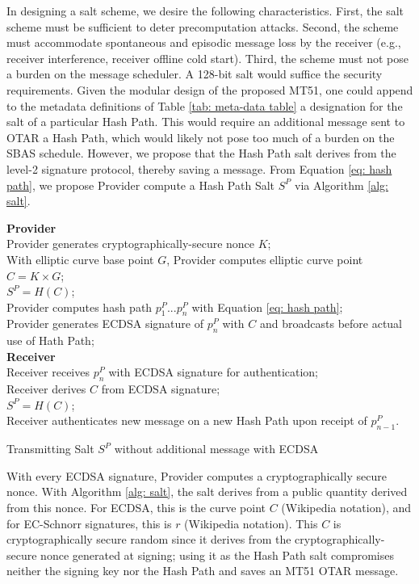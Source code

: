 \documentclass[letterpaper,times]{IONconf/IONconf}
\begin{document}
In designing a salt scheme, we desire the following characteristics.
First, the salt scheme must be sufficient to deter precomputation attacks.
Second, the scheme must accommodate spontaneous and episodic message loss by the receiver (e.g., receiver interference, receiver offline cold start).
Third, the scheme must not pose a burden on the message scheduler.
A 128-bit salt would suffice the security requirements.
Given the modular design of the proposed MT51, one could append to the metadata definitions of Table \ref{tab: meta-data table} a designation for the salt of a particular Hash Path.
This would require an additional message sent to OTAR a Hash Path, which would likely not pose too much of a burden on the SBAS schedule.
However, we propose that the Hash Path salt derives from the level-2 signature protocol, thereby saving a message.
From Equation \eqref{eq: hash path}, we propose Provider compute a Hash Path Salt $S^P$ via Algorithm \ref{alg: salt}.

\begin{algorithm}[H] \label{alg: salt}
\SetAlgoLined
{\bf Provider} \\
Provider generates cryptographically-secure nonce $K$;\\
With elliptic curve base point $G$, Provider computes elliptic curve point $C = K \times G$; \\
$S^P = H(C)$; \\
Provider computes hash path $p^P_1 ... p^P_n$ with Equation \eqref{eq: hash path}; \\
Provider generates ECDSA signature of $p^P_n$ with $C$ and broadcasts before actual use of Hath Path; \\
{\bf Receiver} \\
Receiver receives $p^P_n$ with ECDSA signature for authentication; \\
Receiver derives $C$ from ECDSA signature; \\
$S^P = H(C)$; \\
Receiver authenticates new message on a new Hash Path upon receipt of $p^P_{n-1}$.
\caption{Transmitting Salt $S^P$ without additional message with ECDSA}
\end{algorithm}

With every ECDSA signature, Provider computes a cryptographically secure nonce.
With Algorithm \ref{alg: salt}, the salt derives from a public quantity derived from this nonce.
For ECDSA, this is the curve point $C$ (Wikipedia notation), and for EC-Schnorr signatures, this is $r$ (Wikipedia notation).
This $C$ is cryptographically secure random since it derives from the cryptographically-secure nonce generated at signing; using it as the Hash Path salt compromises neither the signing key nor the Hash Path and saves an MT51 OTAR message.
\end{document}
